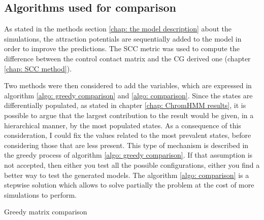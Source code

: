 \subsection{Algorithms used for comparison}


As stated in the methods section \ref{chap: the model description} about the simulations, the attraction potentials are sequentially added to the model in order to improve the predictions. The SCC metric was used to compute the difference between the control contact matrix and the CG derived one (chapter \ref{chap: SCC method}).

Two methods were then considered to add the variables, which are expressed in algorithm \ref{algo: greedy comparison} and \ref{algo: comparison}. Since the states are differentially populated, as stated in chapter \ref{chap: ChromHMM results}, it is possible to argue that the largest contribution to the result would be given, in a hierarchical manner, by the most populated states. As a consequence of this consideration, I could fix the values related to the most prevalent states, before considering those that are less present. This type of mechanism is described in the greedy process of algorithm \ref{algo: greedy comparison}. If that assumption is not accepted, then either you test all the possible configurations, either you find a better way to test the generated models. The algorithm \ref{algo: comparison} is a stepwise solution which allows to solve partially the problem at the cost of more simulations to perform. 

\begin{algorithm}
    \caption{Greedy matrix comparison}\label{algo: greedy comparison}
    \;
\end{algorithm}

